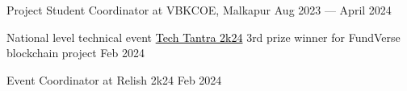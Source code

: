 Project Student Coordinator at VBKCOE, Malkapur \hfill Aug 2023 --- April 2024

National level technical event \href{https://www.linkedin.com/posts/thekiranmahajan_fundverse-fundverse-techtantra2k24-activity-7172095331562577921-4UgM?utm_source=share&utm_medium=member_desktop}{\textcolor{black}{Tech Tantra 2k24}} 3rd prize winner for FundVerse blockchain project \hfill Feb 2024

Event Coordinator at Relish 2k24 \hfill Feb 2024

